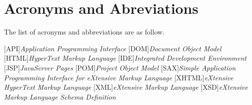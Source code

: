 \chapter*{Acronyms and Abreviations} \label{chap:acronyms}

The list of acronyms and abbreviations are as follow. \\

\begin{acronym}[Z] 

[API]{\emph{Application Programming Interface}}
[DOM]{\emph{Document Object Model}}
[HTML]{\emph{HyperText Markup Language}}
[IDE]{\emph{Integrated Development Environment}}
[JSP]{\emph{JavaServer Pages}}
[POM]{\emph{Project Object Model}}
[SAX]{\emph{Simple Application Programming Interface for eXtensive Markup Language}}
[XHTML]{\emph{eXtensive HyperText Markup Language}}
[XML]{\emph{eXtensive Markup Language}}
[XSD]{\emph{eXtensive Markup Language Schema Definition}}

\end{acronym}


